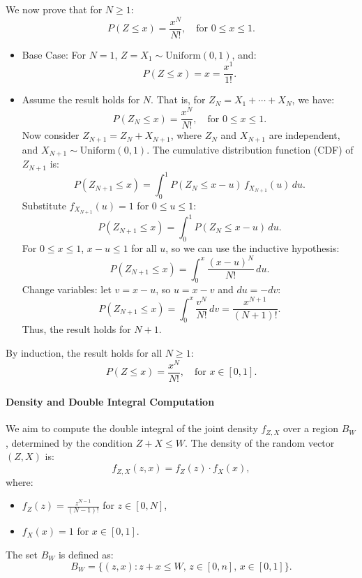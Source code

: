 We now prove that for \( N \geq 1 \):
\[
P(Z \leq x) = \frac{x^N}{N!}, \quad \text{for } 0 \leq x \leq 1.
\]
\begin{itemize}
    \item Base Case:
For \( N = 1 \), \( Z = X_1 \sim \text{Uniform}(0, 1) \), and:
\[
P(Z \leq x) = x = \frac{x^1}{1!}.
\]
    \item Assume the result holds for \( N \). That is, for \( Z_N = X_1 + \cdots + X_N \), we have:
\[
P(Z_N \leq x) = \frac{x^N}{N!}, \quad \text{for } 0 \leq x \leq 1.
\]
Now consider \( Z_{N+1} = Z_N + X_{N+1} \), where \( Z_N \) and \( X_{N+1} \) are independent, and \( X_{N+1} \sim \text{Uniform}(0, 1) \). The cumulative distribution function (CDF) of \( Z_{N+1} \) is:
\[
P(Z_{N+1} \leq x) = \int_0^1 P(Z_N \leq x - u) \, f_{X_{N+1}}(u) \, du.
\]
Substitute \( f_{X_{N+1}}(u) = 1 \) for \( 0 \leq u \leq 1 \):
\[
P(Z_{N+1} \leq x) = \int_0^1 P(Z_N \leq x - u) \, du.
\]
For \( 0 \leq x \leq 1 \), \( x - u \leq 1 \) for all \( u \), so we can use the inductive hypothesis:
\[
P(Z_{N+1} \leq x) = \int_0^x \frac{(x - u)^N}{N!} \, du.
\]
Change variables: let \( v = x - u \), so \( u = x - v \) and \( du = -dv \):
\[
P(Z_{N+1} \leq x) = \int_0^x \frac{v^N}{N!} \, dv = \frac{x^{N+1}}{(N+1)!}.
\]
Thus, the result holds for \( N+1 \).
\end{itemize}
By induction, the result holds for all \( N \geq 1 \):
\[
P(Z \leq x) = \frac{x^N}{N!}, \quad \text{for } x \in [0, 1].
\]


\paragraph{Density and Double Integral Computation}

We aim to compute the double integral of the joint density \( f_{Z, X} \) over a region \( B_W \), determined by the condition \( Z + X \leq W \). The density of the random vector \( (Z, X) \) is:
\[
f_{Z, X}(z, x) = f_Z(z) \cdot f_X(x),
\]
where:
\begin{itemize}
    \item \( f_Z(z) = \frac{z^{N-1}}{(N-1)!} \) for \( z \in [0, N] \),
    \item \( f_X(x) = 1 \) for \( x \in [0, 1] \).
\end{itemize}
The set \( B_W \) is defined as:
\[
B_W = \{(z, x) : z + x \leq W, \, z \in [0, n], \, x \in [0, 1]\}.
\]
